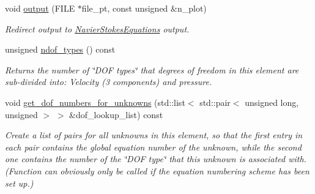 \begin{DoxyCompactItemize}
void \hyperlink{classoomph_1_1AxisymmetricQTaylorHoodElement_a4c2fcefe0593bb39d6c4937b0fdc1292}{output} (F\+I\+LE $\ast$file\+\_\+pt, const unsigned \&n\+\_\+plot)
\begin{DoxyCompactList}\small\item\em Redirect output to \hyperlink{classoomph_1_1NavierStokesEquations}{Navier\+Stokes\+Equations} output. \end{DoxyCompactList}\item 
unsigned \hyperlink{classoomph_1_1AxisymmetricQTaylorHoodElement_a9cd3bbcb75c7a4501c3de68e524a5503}{ndof\+\_\+types} () const
\begin{DoxyCompactList}\small\item\em Returns the number of \char`\"{}\+D\+O\+F types\char`\"{} that degrees of freedom in this element are sub-\/divided into\+: Velocity (3 components) and pressure. \end{DoxyCompactList}\item 
void \hyperlink{classoomph_1_1AxisymmetricQTaylorHoodElement_ad763c91177814d4221ec485b076a38e9}{get\+\_\+dof\+\_\+numbers\+\_\+for\+\_\+unknowns} (std\+::list$<$ std\+::pair$<$ unsigned long, unsigned $>$ $>$ \&dof\+\_\+lookup\+\_\+list) const
\begin{DoxyCompactList}\small\item\em Create a list of pairs for all unknowns in this element, so that the first entry in each pair contains the global equation number of the unknown, while the second one contains the number of the \char`\"{}\+D\+O\+F type\char`\"{} that this unknown is associated with. (Function can obviously only be called if the equation numbering scheme has been set up.) \end{DoxyCompactList}\end{DoxyCompactItemize}
